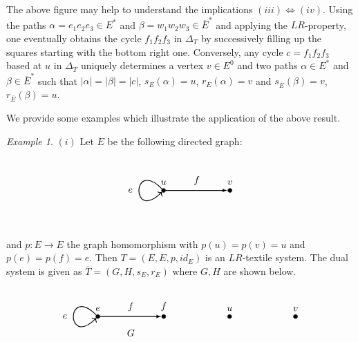 \documentclass[a4paper,reqno,12pt]{amsart}
\theoremstyle{definition}
\theoremstyle{remark}
\newtheorem{example}[thm]{Example}
\begin{document}
The above figure may help to understand the implications $(iii)\Leftrightarrow (iv)$. Using the paths $\alpha=e_1e_2e_3\in E^*$ and $\beta=w_1w_2w_3\in \overline{E}^*$ and applying the $LR$-property, one eventually obtains the cycle $f_1f_2f_3$ in $\Delta_T$ by successively filling up the squares starting with the bottom right one. Conversely, any cycle $c=f_1f_2f_3$ based at $u$ in $\Delta_T$ uniquely determines a vertex $v\in E^0$ and two paths $\alpha\in E^*$ and $\beta\in \overline{E}^*$ such that $|\alpha|=|\beta|=|c|$, $s_E(\alpha)=u$, $r_E(\alpha)=v$ and $s_{\overline{E}}(\beta)=v$, $r_{\overline{E}}(\beta)=u$. 

We provide some examples which illustrate the application of the above result.
\begin{example}\label{ex the self-dual example}
$(i)$ Let $E$ be the following directed graph:

\[
\begin{tikzpicture}[scale=1.2]
\node[inner sep=1.5pt, circle,draw,fill=black,label={$u$}] (A) at (0,0) {};	
\node[inner sep=1.5pt, circle,draw,fill=black,label={$v$}] (B) at (2,0) {};
	
\path[->,black, >=latex,thick] (A) edge [left] node[above=0.05cm]{} (B);
\path[->, black,thick, every loop/.style={looseness=35}](A)edge[in=225, out=135, loop] node [](d) {} (A);

\node at (-1,0) {$e$};

\node at (1,0.3) {$f$};
\end{tikzpicture}
\] 

and $p:E\longrightarrow E$ the graph homomorphism with $p(u)=p(v)=u$ and $p(e)=p(f)=e$. Then $T=(E,E,p,id_E)$ is an $LR$-textile system. The dual system is given as $\overline{T}=(G,H,s_E,r_E)$ where $G,H$ are shown below.
\[
\begin{tikzpicture}[scale=1.2]
\node[inner sep=1.5pt, circle,draw,fill=black,label={$e$}] (A) at (0,0) {};	
\node[inner sep=1.5pt, circle,draw,fill=black,label={$f$}] (B) at (2,0) {};
	
\path[->,black, >=latex,thick] (A) edge [left] node[above=0.05cm]{} (B);
\path[->, black,thick, every loop/.style={looseness=35}](A)edge[in=225, out=135, loop] node [](d) {} (A);

\node at (-1,0) {$e$};

\node at (1,0.3) {$f$};

\node at (1,-0.5) {$G$};

\node[inner sep=1.5pt, circle,draw,fill=black,label={$u$}] (C) at (4,0) {};	
\node[inner sep=1.5pt, circle,draw,fill=black,label={$v$}] (D) at (6,0) {};
	

\end{tikzpicture}\]
\end{example}
\end{document}
